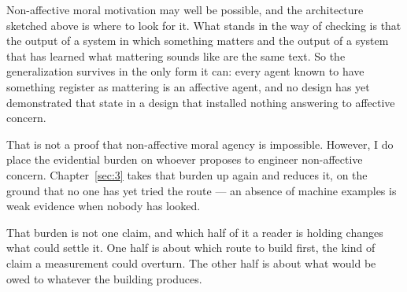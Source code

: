 Non-affective moral motivation may well be possible, and the architecture sketched above is where to look for it. What stands in the way of checking is that the output of a system in which something matters and the output of a system that has learned what mattering sounds like are the same text. So the generalization survives in the only form it can: every agent known to have something register as mattering is an affective agent, and no design has yet demonstrated that state in a design that installed nothing answering to affective concern.

That is not a proof that non-affective moral agency is impossible. However, I do place the evidential burden on whoever proposes to engineer non-affective concern. Chapter~\ref{sec:3} takes that burden up again and reduces it, on the ground that no one has yet tried the route — an absence of machine examples is weak evidence when nobody has looked.

That burden is not one claim, and which half of it a reader is holding changes what could settle it. One half is about which route to build first, the kind of claim a measurement could overturn. The other half is about what would be owed to whatever the building produces.
